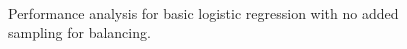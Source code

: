 \begin{figure}[H]
\begin{center}
     \\
\end{center}
\caption[caption]{Performance analysis for basic logistic regression with no
                    added sampling for balancing.}
\label{fig:logistic-basic}
\end{figure}

